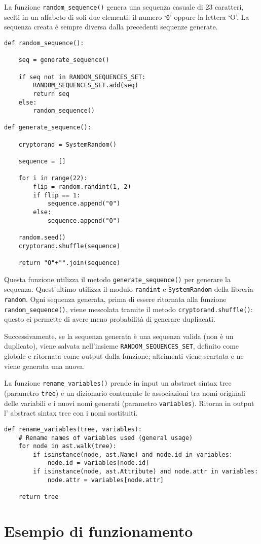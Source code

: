 \documentclass[a4paper,oneside,openright,titlepage,10pt,footinclude,headinclude]{scrbook}
\begin{document}
La funzione \texttt{random\_sequence()} genera una sequenza casuale di 23 caratteri, scelti in un alfabeto di soli due elementi: il numero `\texttt{0}' oppure la lettera `O'. La sequenza creata è sempre diversa dalla precedenti sequenze generate.
\begin{graybox}[innerleftmargin=2,]
\begin{lstlisting}
def random_sequence():

    seq = generate_sequence()

    if seq not in RANDOM_SEQUENCES_SET:
        RANDOM_SEQUENCES_SET.add(seq)
        return seq
    else:
        random_sequence()

def generate_sequence():

    cryptorand = SystemRandom()

    sequence = []

    for i in range(22):
        flip = random.randint(1, 2)
        if flip == 1:
            sequence.append("0")
        else:
            sequence.append("O")

    random.seed()
    cryptorand.shuffle(sequence)

    return "O"+"".join(sequence)
\end{lstlisting}
\end{graybox}

Questa funzione utilizza il metodo \texttt{generate\_sequence()} per generare la sequenza. Quest'ultimo utilizza il modulo \texttt{randint} e \texttt{SystemRandom} della libreria \texttt{random}.  Ogni sequenza generata, prima di essere ritornata alla funzione \texttt{random\_sequence()}, viene mescolata tramite il metodo \texttt{cryptorand.shuffle()}: questo ci permette di avere meno probabilità di generare dupliacati.

Successivamente, se la sequenza generata è una sequenza valida (non è un duplicato), viene salvata nell'insieme \texttt{RANDOM\_SEQUENCES\_SET}, definito come globale e ritornata come output dalla funzione; altrimenti viene scartata e ne viene generata una nuova.\bigskip

La funzione \texttt{rename\_variables()} prende in input un abstract sintax tree (parametro \texttt{tree}) e un dizionario contenente le associazioni tra nomi originali delle variabili  e i nuovi nomi generati (parametro \texttt{variables}). Ritorna in output l' abstract sintax tree con i nomi sostituiti.
\begin{graybox}[innerleftmargin=2,]
\begin{lstlisting}
def rename_variables(tree, variables):
    # Rename names of variables used (general usage)
    for node in ast.walk(tree):
        if isinstance(node, ast.Name) and node.id in variables:
            node.id = variables[node.id]
        if isinstance(node, ast.Attribute) and node.attr in variables:
            node.attr = variables[node.attr]

    return tree
\end{lstlisting}
\end{graybox}
\chapter{Esempio di funzionamento}\label{esempio}


\begin{thebibliography}{9}

\end{thebibliography}
\end{document}
